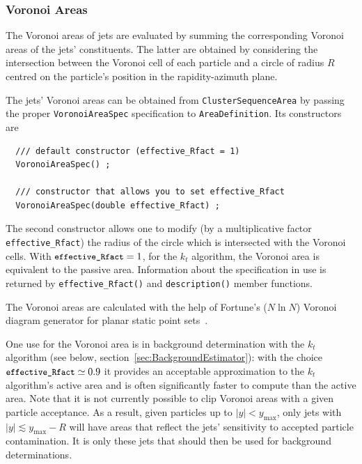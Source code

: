 \documentclass[12pt,a4]{article}
\newcommand{\ttt}[1]{{\small\texttt{#1}}}
\begin{document}

\subsubsection{Voronoi Areas}
\label{sec:voronoi-areas}

The Voronoi areas of jets are evaluated by summing the corresponding
Voronoi areas of the jets' constituents. The latter are obtained 
by considering the intersection between
the Voronoi cell of each particle and a circle of radius $R$ centred 
on the particle's position in the rapidity-azimuth plane.

The jets' Voronoi areas can be obtained from 
\ttt{ClusterSequenceArea} by passing
the proper \ttt{VoronoiAreaSpec} specification to
\ttt{AreaDefinition}. Its constructors are
\begin{lstlisting}
  /// default constructor (effective_Rfact = 1)
  VoronoiAreaSpec() ;
  
  /// constructor that allows you to set effective_Rfact
  VoronoiAreaSpec(double effective_Rfact) ; 
\end{lstlisting}
The second constructor allows one to modify (by a multiplicative
factor \ttt{effective\_Rfact}) the radius of the circle which is
intersected with the Voronoi cells. With $\ttt{effective\_Rfact} = 1$,
for the $k_t$ algorithm, the Voronoi area is equivalent to the passive
area.
%
Information about the specification in use is returned by
\ttt{effective\_Rfact()} and \ttt{description()} member functions.

The Voronoi areas are calculated with the help of Fortune's ($N \ln
N$) Voronoi diagram generator for planar static point
sets~\cite{Fortune}.

One use for the Voronoi area is in background determination with the
$k_t$ algorithm (see below, section~\ref{sec:BackgroundEstimator}): with
the choice $\ttt{effective\_Rfact}\simeq0.9$ it provides an acceptable
approximation to the $k_t$ algorithm's active area and is often
significantly faster to compute than the active area.
%
Note that it is not currently possible to clip Voronoi areas with a
given particle acceptance. 
%
As a result, given particles up to $|y|<y_{\max}$, only jets with $|y|
\lesssim y_{\max} - R$ will have areas that reflect the jets'
sensitivity to accepted particle contamination.
%
It is only these jets that should then be used for background
determinations.
\end{document}
